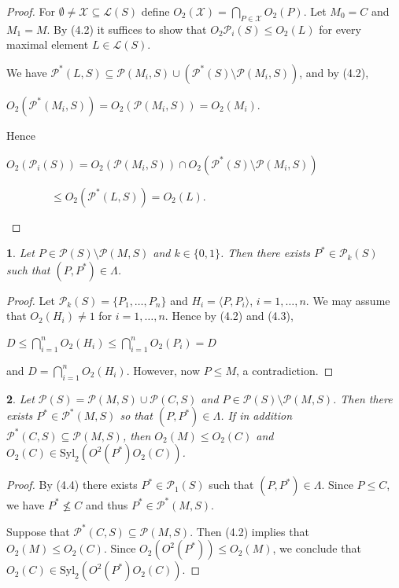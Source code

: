 \documentclass[11pt]{article}
\theoremstyle{plain}
\theoremstyle{stmplain}
\newtheorem{stm}{}[section]
\newcommand{\disp}[1]{\begin{center}$\displaystyle #1$\end{center}}
\begin{document}
\begin{proof}
For $\emptyset \ne \mathcal{X} \subseteq \mathcal{L}(S)$ define $O_2(\mathcal{X})
= \bigcap_{P \in \mathcal{X}} O_2(P)$. Let $M_0 = C$ and $M_1 = M$. By (4.2) it
suffices to show that $O_2\mathcal{P}_i(S) \le O_2(L)$ for every maximal
element $L \in \mathcal{L}(S)$.

\smallskip
\noindent We have $\mathcal{P}^*(L, S) \subseteq \mathcal{P}(M_i, S) \cup
(\mathcal{P}^*(S) \setminus \mathcal{P}(M_i, S))$, and by (4.2),
\disp{O_2(\mathcal{P}^*(M_i, S)) = O_2(\mathcal{P}(M_i, S)) = O_2(M_i).}
Hence
\disp{O_2(\mathcal{P}_i(S)) = O_2(\mathcal{P}(M_i, S)) \cap
O_2(\mathcal{P}^*(S) \setminus \mathcal{P}(M_i, S))}
\disp{\quad\quad\quad\quad \le O_2(\mathcal{P}^*(L, S)) = O_2(L).}
\end{proof}

\begin{stm}\label{st:4.4}
Let $P \in \mathcal{P}(S) \setminus \mathcal{P}(M, S)$ and $k \in \{0, 1\}$. Then
there exists $P^* \in \mathcal{P}_k(S)$ such that $(P, P^*) \in \Lambda$.
\end{stm}

\begin{proof}
Let $\mathcal{P}_k(S) = \{P_1, \ldots, P_n\}$ and $H_i = \langle P, P_i \rangle$,
$i = 1, \ldots, n$. We may assume that $O_2(H_i) \ne 1$ for $i = 1, \ldots,
n$. Hence by (4.2) and (4.3),
\disp{D \le \bigcap_{i=1}^n O_2(H_i) \le \bigcap_{i=1}^n O_2(P_i) = D}
and $D = \bigcap_{i=1}^n O_2(H_i)$. However, now $P \le M$, a contradiction.
\end{proof}

\begin{stm}\label{st:4.5}
Let $\mathcal{P}(S) = \mathcal{P}(M, S) \cup \mathcal{P}(C, S)$ and $P \in
\mathcal{P}(S) \setminus \mathcal{P}(M, S)$. Then there exists $P^* \in
\mathcal{P}^*(M, S)$ so that $(P, P^*) \in \Lambda$. If in addition
$\mathcal{P}^*(C, S) \subseteq \mathcal{P}(M, S)$, then $O_2(M) \le O_2(C)$
and $O_2(C) \in \mathrm{Syl}_2(O^2(P^*)O_2(C))$.
\end{stm}

\begin{proof}
By (4.4) there exists $P^* \in \mathcal{P}_1(S)$ such that $(P, P^*) \in
\Lambda$. Since $P \le C$, we have $P^* \nleq C$ and thus $P^* \in
\mathcal{P}^*(M, S)$.

\smallskip
\noindent Suppose that $\mathcal{P}^*(C, S) \subseteq \mathcal{P}(M, S)$. Then
(4.2) implies that $O_2(M) \le O_2(C)$. Since $O_2(O^2(P^*)) \le O_2(M)$, we
conclude that $O_2(C) \in \mathrm{Syl}_2(O^2(P^*)O_2(C))$.
\end{proof}
\end{document}
